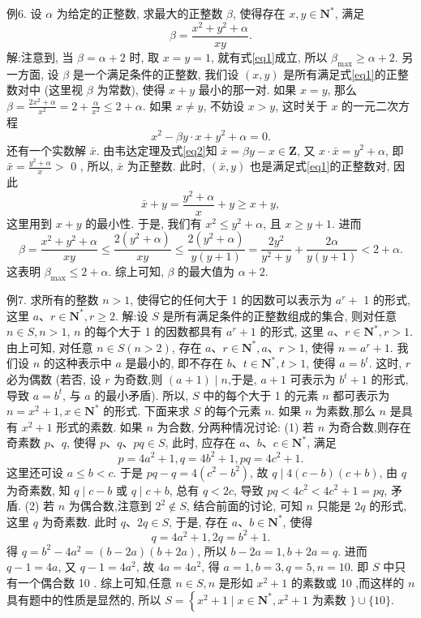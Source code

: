 例6. 设 $\alpha$ 为给定的正整数, 求最大的正整数 $\beta$, 使得存在 $x, y \in \mathbf{N}^*$, 满足
$$
\beta=\frac{x^2+y^2+\alpha}{x y} . \label{eq1}
$$
解:注意到, 当 $\beta=\alpha+2$ 时, 取 $x=y=1$, 就有式\ref{eq1}成立, 所以 $\beta_{\max } \geqslant \alpha+2$. 另一方面, 设 $\beta$ 是一个满足条件的正整数, 我们设 $(x, y)$ 是所有满足式\ref{eq1}的正整数对中 (这里视 $\beta$ 为常数), 使得 $x+y$ 最小的那一对.
如果 $x=y$, 那么 $\beta=\frac{2 x^2+\alpha}{x^2}=2+\frac{\alpha}{x^2} \leqslant 2+\alpha$.
如果 $x \neq y$, 不妨设 $x>y$, 这时关于 $x$ 的一元二次方程
$$
x^2-\beta y \cdot x+y^2+\alpha=0 . \label{eq2}
$$
还有一个实数解 $\bar{x}$.
由韦达定理及式\ref{eq2}知 $\bar{x}=\beta y-x \in \mathbf{Z}$, 又 $x \cdot \bar{x}=y^2+\alpha$, 即 $\bar{x}=\frac{y^2+\alpha}{x}>$ 0 , 所以, $\bar{x}$ 为正整数.
此时, $(\bar{x}, y)$ 也是满足式\ref{eq1}的正整数对, 因此
$$
\bar{x}+y=\frac{y^2+\alpha}{x}+y \geqslant x+y,
$$
这里用到 $x+y$ 的最小性.
于是, 我们有 $x^2 \leqslant y^2+\alpha$, 且 $x \geqslant y+1$. 进而
$$
\beta=\frac{x^2+y^2+\alpha}{x y} \leqslant \frac{2\left(y^2+\alpha\right)}{x y} \leqslant \frac{2\left(y^2+\alpha\right)}{y(y+1)}=\frac{2 y^2}{y^2+y}+\frac{2 \alpha}{y(y+1)}<2+\alpha .
$$
这表明 $\beta_{\max } \leqslant 2+\alpha$.
综上可知, $\beta$ 的最大值为 $\alpha+2$.



例7. 求所有的整数 $n>1$, 使得它的任何大于 1 的因数可以表示为 $a^r+$ 1 的形式, 这里 $a 、 r \in \mathbf{N}^*, r \geqslant 2$.
解:设 $S$ 是所有满足条件的正整数组成的集合, 则对任意 $n \in S, n>1$,
$n$ 的每个大于 1 的因数都具有 $a^r+1$ 的形式, 这里 $a 、 r \in \mathbf{N}^*, r>1$.
由上可知, 对任意 $n \in S(n>2)$, 存在 $a 、 r \in \mathbf{N}^*, a 、 r>1$, 使得 $n= a^r+1$. 我们设 $n$ 的这种表示中 $a$ 是最小的, 即不存在 $b 、 t \in \mathbf{N}^*, t>1$, 使得 $a=b^t$. 这时, $r$ 必为偶数 (若否, 设 $r$ 为奇数,则 $(a+1) \mid n$,于是, $a+1$ 可表示为 $b^t+1$ 的形式,导致 $a=b^t$, 与 $a$ 的最小矛盾). 所以, $S$ 中的每个大于 1 的元素 $n$ 都可表示为 $n=x^2+1, x \in \mathbf{N}^*$ 的形式.
下面来求 $S$ 的每个元素 $n$.
如果 $n$ 为素数,那么 $n$ 是具有 $x^2+1$ 形式的素数.
如果 $n$ 为合数, 分两种情况讨论:
(1) 若 $n$ 为奇合数,则存在奇素数 $p 、 q$, 使得 $p 、 q 、 p q \in S$, 此时, 应存在 $a 、 b 、 c \in \mathbf{N}^*$, 满足
$$
p=4 a^2+1, q=4 b^2+1, p q=4 c^2+1 .
$$
这里还可设 $a \leqslant b<c$. 于是 $p q-q=4\left(c^2-b^2\right)$, 故 $q \mid 4(c-b)(c+b)$, 由 $q$ 为奇素数, 知 $q \mid c-b$ 或 $q \mid c+b$, 总有 $q<2 c$, 导致 $p q<4 c^2<4 c^2+1=p q$, 矛盾.
(2) 若 $n$ 为偶合数,注意到 $2^2 \notin S$, 结合前面的讨论, 可知 $n$ 只能是 $2 q$ 的形式, 这里 $q$ 为奇素数.
此时 $q 、 2 q \in S$, 于是, 存在 $a 、 b \in \mathbf{N}^*$, 使得
$$
q=4 a^2+1,2 q=b^2+1 .
$$
得 $q=b^2-4 a^2=(b-2 a)(b+2 a)$, 所以 $b-2 a=1, b+2 a=q$. 进而 $q- 1=4 a$, 又 $q-1=4 a^2$, 故 $4 a=4 a^2$, 得 $a=1, b=3, q=5, n=10$. 即 $S$ 中只有一个偶合数 10 .
综上可知,任意 $n \in S, n$ 是形如 $x^2+1$ 的素数或 10 ,而这样的 $n$ 具有题中的性质是显然的, 所以 $S=\left\{x^2+1 \mid x \in \mathbf{N}^*, x^2+1\right.$ 为素数 $\} \cup\{10\}$.



